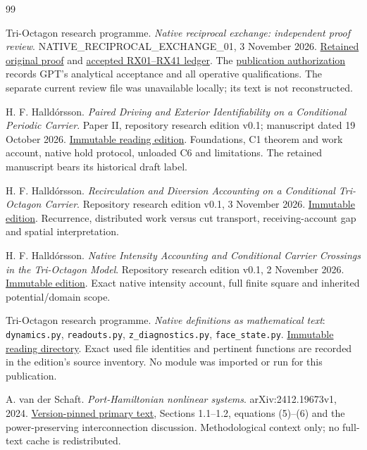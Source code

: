 \begin{thebibliography}{99}\small\raggedright
{} Tri-Octagon research programme.
\emph{Native reciprocal exchange: independent proof review}.
NATIVE\_RECIPROCAL\_EXCHANGE\_01, 3 November 2026.
\href{evidence/accepted_proof.md}{Retained original proof} and
\href{evidence/accepted_claim_source_ledger.md}{accepted RX01--RX41 ledger}.
The \href{evidence/publication_authorization.md}{publication authorization} records GPT's analytical acceptance and all operative qualifications. The separate current review file was unavailable locally; its text is not reconstructed.

 H. F. Halld\'orsson.
\emph{Paired Driving and Exterior Identifiability on a Conditional Periodic Carrier}.
Paper II, repository research edition v0.1; manuscript dated 19 October 2026.
\href{https://github.com/pzychozen/trioctagon-physics/tree/47178242ebb81cf5516dd7d283395f8acdb86a48/SRG_REDISCOVERY/PAPERS/PAIRED_DRIVING_EXTERIOR_IDENTIFIABILITY/publication/v0.1}{Immutable reading edition}.
Foundations, C1 theorem and work account, native hold protocol, unloaded C6 and limitations. The retained manuscript bears its historical draft label.

 H. F. Halld\'orsson.
\emph{Recirculation and Diversion Accounting on a Conditional Tri-Octagon Carrier}.
Repository research edition v0.1, 3 November 2026.
\href{https://github.com/pzychozen/trioctagon-physics/tree/47178242ebb81cf5516dd7d283395f8acdb86a48/papers/RECIRCULATION_AND_DIVERSION_ACCOUNTING/publication/v0.1}{Immutable edition}.
Recurrence, distributed work versus cut transport, receiving-account gap and spatial interpretation.

 H. F. Halld\'orsson.
\emph{Native Intensity Accounting and Conditional Carrier Crossings in the Tri-Octagon Model}.
Repository research edition v0.1, 2 November 2026.
\href{https://github.com/pzychozen/trioctagon-physics/tree/a05c545644417b10f1328e203d421349f7b20bf6/papers/NATIVE_INTENSITY_AND_CONDITIONAL_CARRIER_CROSSINGS/publication/v0.1}{Immutable edition}.
Exact native intensity account, full finite square and inherited potential/domain scope.

 Tri-Octagon research programme.
\emph{Native definitions as mathematical text}:
\texttt{dynamics.py}, \texttt{readouts.py}, \texttt{z\_diagnostics.py}, \texttt{face\_state.py}.
\href{https://github.com/pzychozen/trioctagon-physics/tree/47178242ebb81cf5516dd7d283395f8acdb86a48/kernel_physics}{Immutable reading directory}.
Exact used file identities and pertinent functions are recorded in the edition's source inventory. No module was imported or run for this publication.

 A. van der Schaft.
\emph{Port-Hamiltonian nonlinear systems}.
arXiv:2412.19673v1, 2024.
\href{https://arxiv.org/html/2412.19673v1}{Version-pinned primary text}, Sections 1.1--1.2, equations (5)--(6) and the power-preserving interconnection discussion. Methodological context only; no full-text cache is redistributed.
\end{thebibliography}
